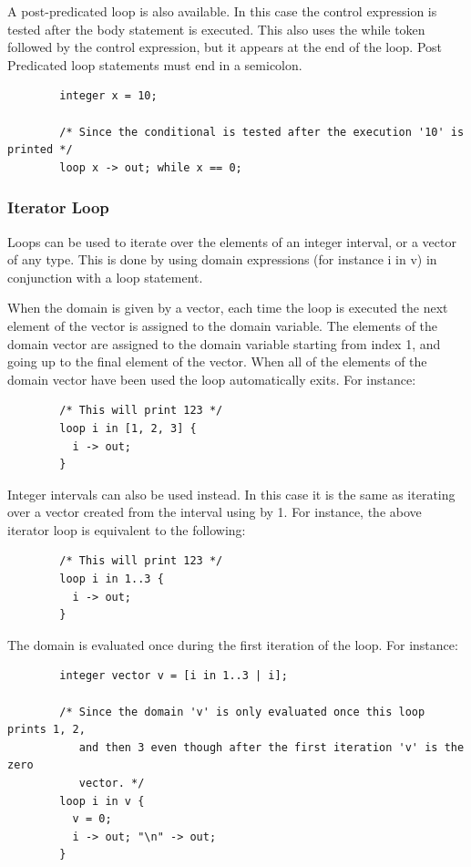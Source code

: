 \documentclass{article}
\begin{document}
      A post-predicated loop is also available. In this case the control expression is tested after the body
      statement is executed. This also uses the while token followed by the control expression, but it appears at
      the end of the loop. Post Predicated loop statements must end in a semicolon.

      \begin{lstlisting}
        integer x = 10;

        /* Since the conditional is tested after the execution '10' is printed */
        loop x -> out; while x == 0;
      \end{lstlisting}


    \subsubsection{Iterator Loop}\label{sec:iteratorLoop}

      Loops can be used to iterate over the elements of an integer interval, or a vector of any type. This is done
      by using domain expressions (for instance i in v) in conjunction with a loop statement.

      When the domain is given by a vector, each time the loop is executed the next element of the vector is
      assigned to the domain variable. The elements of the domain vector are assigned to the domain variable
      starting from index 1, and going up to the final element of the vector. When all of the elements of the
      domain vector have been used the loop automatically exits. For instance:

      \begin{lstlisting}
        /* This will print 123 */
        loop i in [1, 2, 3] {
          i -> out;
        }
      \end{lstlisting}

      Integer intervals can also be used instead. In this case it is the same as iterating over a vector created
      from the interval using by 1. For instance, the above iterator loop is equivalent to the following:

      \begin{lstlisting}
        /* This will print 123 */
        loop i in 1..3 {
          i -> out;
        }
      \end{lstlisting}

      The domain is evaluated once during the first iteration of the loop. For instance:

      \begin{lstlisting}
        integer vector v = [i in 1..3 | i];

        /* Since the domain 'v' is only evaluated once this loop prints 1, 2,
           and then 3 even though after the first iteration 'v' is the zero
           vector. */
        loop i in v {
          v = 0;
          i -> out; "\n" -> out;
        }
      \end{lstlisting}
\end{document}
